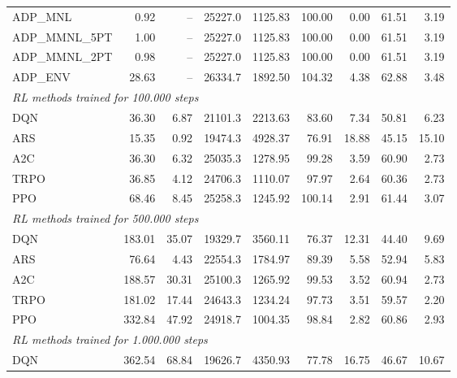 \begin{samepage}
\begin{center}
\begin{tabular}{l|rr|rr|rr|rr}
    \midrule
    ADP\_MNL     &     0.92 &    -- &    25227.0 &    1125.83 &  100.00 &    0.00 &   61.51 &    3.19 \\
    ADP\_MMNL\_5PT &     1.00 &    -- &    25227.0 &    1125.83 &  100.00 &    0.00 &   61.51 &    3.19 \\
    ADP\_MMNL\_2PT &     0.98 &    -- &    25227.0 &    1125.83 &  100.00 &    0.00 &   61.51 &    3.19 \\
    ADP\_ENV     &    28.63 &    -- &    26334.7 &    1892.50 &  104.32 &    4.38 &   62.88 &    3.48 \\
    \midrule
    \multicolumn{9}{l}{\textit{RL methods trained for 100.000 steps}} \\
    \midrule
    DQN          &    36.30 &     6.87 &    21101.3 &    2213.63 &   83.60 &    7.34 &   50.81 &    6.23 \\
    ARS          &    15.35 &     0.92 &    19474.3 &    4928.37 &   76.91 &   18.88 &   45.15 &   15.10 \\
    A2C          &    36.30 &     6.32 &    25035.3 &    1278.95 &   99.28 &    3.59 &   60.90 &    2.73 \\
    TRPO         &    36.85 &     4.12 &    24706.3 &    1110.07 &   97.97 &    2.64 &   60.36 &    2.73 \\
    PPO          &    68.46 &     8.45 &    25258.3 &    1245.92 &  100.14 &    2.91 &   61.44 &    3.07 \\
    \midrule
    \multicolumn{9}{l}{\textit{RL methods trained for 500.000 steps}} \\
    \midrule
    DQN          &   183.01 &    35.07 &    19329.7 &    3560.11 &   76.37 &   12.31 &   44.40 &    9.69 \\
    ARS          &    76.64 &     4.43 &    22554.3 &    1784.97 &   89.39 &    5.58 &   52.94 &    5.83 \\
    A2C          &   188.57 &    30.31 &    25100.3 &    1265.92 &   99.53 &    3.52 &   60.94 &    2.73 \\
    TRPO         &   181.02 &    17.44 &    24643.3 &    1234.24 &   97.73 &    3.51 &   59.57 &    2.20 \\
    PPO          &   332.84 &    47.92 &    24918.7 &    1004.35 &   98.84 &    2.82 &   60.86 &    2.93 \\
    \midrule
    \multicolumn{9}{l}{\textit{RL methods trained for 1.000.000 steps}} \\
    \midrule
    DQN          &   362.54 &    68.84 &    19626.7 &    4350.93 &   77.78 &   16.75 &   46.67 &   10.67 \\

\end{tabular}
\end{center}
\end{samepage}
